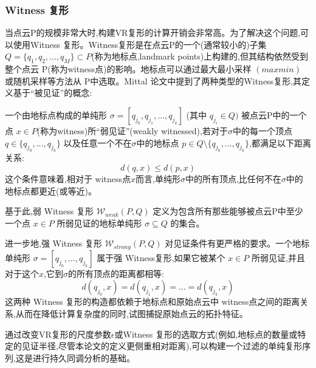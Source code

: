 \subsubsection{Witness 复形} %
当点云P的规模非常大时,构建VR复形的计算开销会非常高。为了解决这个问题,可以使用Witness 复形\cite{de2004topological}。Witness复形是在点云P的一个(通常较小的)子集 $Q=\{q_{1},q_{2},...,q_{M}\}\subset P$(称为地标点,landmark points)上构建的,但其结构依然受到整个点云 P(称为witness点)的影响。地标点可以通过最大最小采样 $(maxmin)$ 或随机采样等方法从 P中选取。Mittal \cite{mittal2017topological}论文中提到了两种类型的Witness复形,其定义基于“被见证”的概念:

一个由地标点构成的单纯形 $\sigma=[q_{j_{0}},q_{j_{1}},...,q_{j_{k}}]$ (其中 $q_{j_{i}}\in Q)$ 被点云P中的一个点 $x\in P$(称为witness)所“弱见证”(weakly witnessed),若对于$\sigma$中的每一个顶点 $q\in\{q_{j_{0}},...,q_{j_{k}}\}$ 以及任意一个不在$\sigma$中的地标点 $p\in Q\setminus\{q_{j_{0}},...,q_{j_{k}}\}$,都满足以下距离关系:
\begin{equation}
    d(q,x)\le d(p,x)
\end{equation}
这个条件意味着,相对于 witness点$x$而言,单纯形$\sigma$中的所有顶点,比任何不在$\sigma$中的地标点都更近(或等近)。

基于此,弱 Witness 复形 $\mathcal{W}_{weak}(P,Q)$ 定义为包含所有那些能够被点云P中至少一个点 $x\in P$ 所弱见证的地标单纯形 $\sigma\subseteq Q$ 的集合。

进一步地,强 Witness 复形 $\mathcal{W}_{strong}(P,Q)$ 对见证条件有更严格的要求。一个地标单纯形 $\sigma=[q_{j_{0}},...,q_{j_{k}}]$ 属于强 Witness复形,如果它被某个 $x\in P$ 所弱见证,并且对于这个$x$,它到$\sigma$的所有顶点的距离都相等:
\begin{equation}
    d(q_{j_{0}},x)=d(q_{j_{1}},x)=...=d(q_{j_{k}},x)
\end{equation}
这两种 Witness 复形的构造都依赖于地标点和原始点云中 witness点之间的距离关系,从而在降低计算复杂度的同时,试图捕捉原始点云的拓扑特征。

通过改变VR复形的尺度参数$\epsilon$或Witness 复形的选取方式(例如,地标点的数量或特定的见证半径,尽管本论文的定义更侧重相对距离),可以构建一个过滤的单纯复形序列,这是进行持久同调分析的基础。

